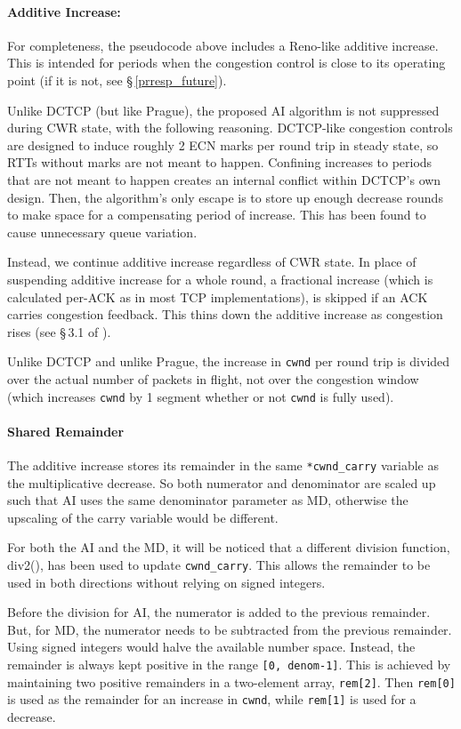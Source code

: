 \paragraph{Additive Increase:} For completeness, the pseudocode above %
includes a Reno-like additive increase.
This is intended for periods when the congestion control is close to its
operating point (if it is not, see \S\,\ref{prresp_future}).

Unlike DCTCP (but like Prague), the proposed AI algorithm is not suppressed during
CWR state, with the following reasoning. DCTCP-like congestion controls are
designed to induce roughly 2 ECN marks per round trip in steady state, so RTTs
without marks are not meant to happen. Confining increases to periods that are
not meant to happen creates an internal conflict within DCTCP's own design.
Then, the algorithm's only escape is to store up enough decrease rounds to make
space for a compensating period of increase. This has been found to cause
unnecessary queue variation.

Instead, we continue additive increase regardless of CWR state. In place of
suspending additive increase for a whole round, a fractional increase (which is
calculated per-ACK as in most TCP implementations), is skipped if an ACK
carries congestion feedback. This thins down the additive increase as congestion
rises (see \S\,3.1 of \cite{Briscoe17a:CC_Tensions_TR}).

Unlike DCTCP and unlike Prague, the increase in \texttt{cwnd} per round trip is divided
over the actual number of packets in flight, not over the congestion window
(which increases \texttt{cwnd} by 1 segment whether or not \texttt{cwnd} is
fully used).

\paragraph{Shared Remainder} The additive increase stores its remainder in the same \texttt{*cwnd\_carry}
variable as the multiplicative decrease. So both numerator and denominator are
scaled up such that AI uses the same denominator parameter as MD, otherwise the
upscaling of the carry variable would be different.

For both the AI and the MD, it will be noticed that a different division
function, div2(), has been used to update \texttt{cwnd\_carry}. This allows the
remainder to be used in both directions without relying on signed integers.

Before the division for AI, the numerator is added to the previous remainder.
But, for MD, the numerator needs to be subtracted from the previous remainder.
Using signed integers would halve the available number space. Instead, the
remainder is always kept positive in the range \texttt{[0, denom-1]}. This is
achieved by maintaining two positive remainders in a two-element array,
\texttt{rem[2]}. Then \texttt{rem[0]} is used as the remainder for an increase
in \texttt{cwnd}, while \texttt{rem[1]} is used for a decrease.

